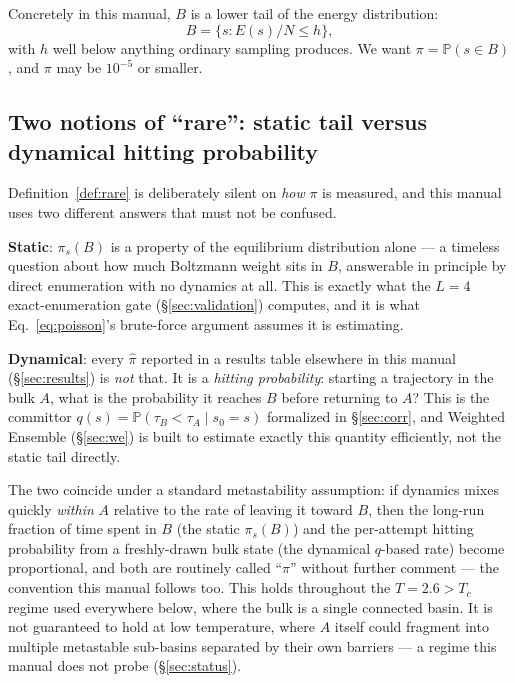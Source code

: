 \documentclass[11pt,a4paper]{article}
\begin{document}
Concretely in this manual, $B$ is a lower tail of the energy distribution:
\begin{equation}
B=\{s: E(s)/N \le h\},
\end{equation}
with $h$ well below anything ordinary sampling produces. We want $\pi=\mathbb{P}(s\in B)$, and
$\pi$ may be $10^{-5}$ or smaller.

\subsection{Two notions of ``rare'': static tail versus dynamical hitting probability}
Definition~\ref{def:rare} is deliberately silent on \emph{how} $\pi$ is measured, and this manual
uses two different answers that must not be confused.

\textbf{Static}: $\pi_s(B)$ is a property of the equilibrium distribution alone --- a
timeless question about how much Boltzmann weight sits in $B$, answerable in principle by
direct enumeration with no dynamics at all. This is exactly what the $L=4$ exact-enumeration
gate (\S\ref{sec:validation}) computes, and it is what Eq.~\eqref{eq:poisson}'s brute-force
argument assumes it is estimating.

\textbf{Dynamical}: every $\hat\pi$ reported in a results table elsewhere in this manual
(\S\ref{sec:results}) is \emph{not} that. It is a \emph{hitting probability}: starting a
trajectory in the bulk $A$, what is the probability it reaches $B$ before returning to $A$? This
is the committor $q(s)=\mathbb{P}(\tau_B<\tau_A\mid s_0=s)$ formalized in
\S\ref{sec:corr}, and Weighted Ensemble (\S\ref{sec:we}) is built to estimate exactly this
quantity efficiently, not the static tail directly.

The two coincide under a standard metastability assumption: if dynamics mixes quickly
\emph{within} $A$ relative to the rate of leaving it toward $B$, then the long-run fraction of
time spent in $B$ (the static $\pi_s(B)$) and the per-attempt hitting probability from a
freshly-drawn bulk state (the dynamical $q$-based rate) become proportional, and both are
routinely called ``$\pi$'' without further comment --- the convention this manual follows too.
This holds throughout the $T=2.6>T_c$ regime used everywhere below, where the bulk is a single
connected basin. It is not guaranteed to hold at low temperature, where $A$ itself could
fragment into multiple metastable sub-basins separated by their own barriers --- a regime this
manual does not probe (\S\ref{sec:status}).
\end{document}
